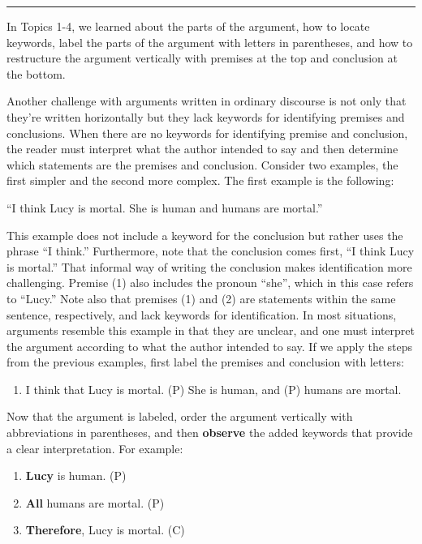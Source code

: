 \documentclass[
]{book}
\providecommand{\tightlist}{%
  \setlength{\itemsep}{0pt}\setlength{\parskip}{0pt}}
\begin{document}
\begin{center}\rule{0.5\linewidth}{0.5pt}\end{center}

In Topics 1-4, we learned about the parts of the argument, how to locate keywords, label the parts of the argument with letters in parentheses, and how to restructure the argument vertically with premises at the top and conclusion at the bottom.

Another challenge with arguments written in ordinary discourse is not only that they're written horizontally but they lack keywords for identifying premises and conclusions. When there are no keywords for identifying premise and conclusion, the reader must interpret what the author intended to say and then determine which statements are the premises and conclusion. Consider two examples, the first simpler and the second more complex. The first example is the following:

``I think Lucy is mortal. She is human and humans are mortal.''

This example does not include a keyword for the conclusion but rather uses the phrase ``I think.'' Furthermore, note that the conclusion comes first, ``I think Lucy is mortal.'' That informal way of writing the conclusion makes identification more challenging. Premise (1) also includes the pronoun ``she'', which in this case refers to ``Lucy.'' Note also that premises (1) and (2) are statements within the same sentence, respectively, and lack keywords for identification. In most situations, arguments resemble this example in that they are unclear, and one must interpret the argument according to what the author intended to say. If we apply the steps from the previous examples, first label the premises and conclusion with letters:

\begin{enumerate}
\def\labelenumi{(\Alph{enumi})}
\setcounter{enumi}{2}
\tightlist
\item
  I think that Lucy is mortal. (P) She is human, and (P) humans are mortal.
\end{enumerate}

Now that the argument is labeled, order the argument vertically with abbreviations in parentheses, and then \textbf{observe} the added keywords that provide a clear interpretation. For example:

\begin{enumerate}
\def\labelenumi{\arabic{enumi}.}
\tightlist
\item
  \textbf{Lucy} is human. (P)\\
\item
  \textbf{All} humans are mortal. (P)\\
\item
  \textbf{Therefore}, Lucy is mortal. (C)
\end{enumerate}
\end{document}
